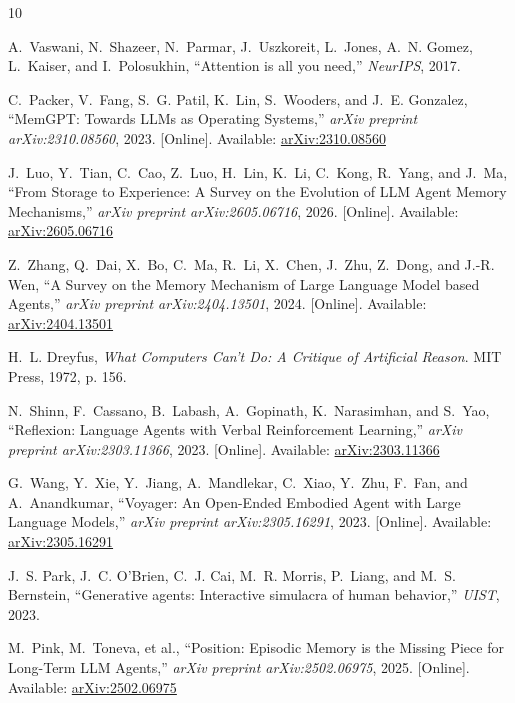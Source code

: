 \documentclass[10pt,journal,compsoc]{IEEEtran}
\begin{document}

\begin{thebibliography}{10}

A.~Vaswani, N.~Shazeer, N.~Parmar, J.~Uszkoreit, L.~Jones, A.~N. Gomez, L.~Kaiser, and I.~Polosukhin, ``Attention is all you need,'' {\em NeurIPS}, 2017.

C.~Packer, V.~Fang, S.~G. Patil, K.~Lin, S.~Wooders, and J.~E. Gonzalez, ``MemGPT: Towards LLMs as Operating Systems,'' {\em arXiv preprint arXiv:2310.08560}, 2023. [Online]. Available: \href{https://arxiv.org/abs/2310.08560}{arXiv:2310.08560}

J.~Luo, Y.~Tian, C.~Cao, Z.~Luo, H.~Lin, K.~Li, C.~Kong, R.~Yang, and J.~Ma, ``From Storage to Experience: A Survey on the Evolution of LLM Agent Memory Mechanisms,'' {\em arXiv preprint arXiv:2605.06716}, 2026. [Online]. Available: \href{https://arxiv.org/abs/2605.06716}{arXiv:2605.06716}

Z.~Zhang, Q.~Dai, X.~Bo, C.~Ma, R.~Li, X.~Chen, J.~Zhu, Z.~Dong, and J.-R. Wen, ``A Survey on the Memory Mechanism of Large Language Model based Agents,'' {\em arXiv preprint arXiv:2404.13501}, 2024. [Online]. Available: \href{https://arxiv.org/abs/2404.13501}{arXiv:2404.13501}

H.~L. Dreyfus, {\em What Computers Can't Do: A Critique of Artificial Reason}. MIT Press, 1972, p. 156.

N.~Shinn, F.~Cassano, B.~Labash, A.~Gopinath, K.~Narasimhan, and S.~Yao, ``Reflexion: Language Agents with Verbal Reinforcement Learning,'' {\em arXiv preprint arXiv:2303.11366}, 2023. [Online]. Available: \href{https://arxiv.org/abs/2303.11366}{arXiv:2303.11366}

G.~Wang, Y.~Xie, Y.~Jiang, A.~Mandlekar, C.~Xiao, Y.~Zhu, F.~Fan, and A.~Anandkumar, ``Voyager: An Open-Ended Embodied Agent with Large Language Models,'' {\em arXiv preprint arXiv:2305.16291}, 2023. [Online]. Available: \href{https://arxiv.org/abs/2305.16291}{arXiv:2305.16291}

J.~S. Park, J.~C. O'Brien, C.~J. Cai, M.~R. Morris, P.~Liang, and M.~S. Bernstein, ``Generative agents: Interactive simulacra of human behavior,'' {\em UIST}, 2023.

M.~Pink, M.~Toneva, et al., ``Position: Episodic Memory is the Missing Piece for Long-Term LLM Agents,'' {\em arXiv preprint arXiv:2502.06975}, 2025. [Online]. Available: \href{https://arxiv.org/abs/2502.06975}{arXiv:2502.06975}


\end{thebibliography}
\end{document}
